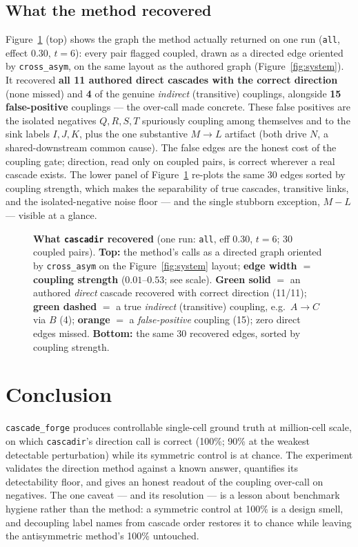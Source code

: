 \documentclass[11pt,a4paper]{article}
\begin{document}
\subsection{What the method recovered}
Figure~\ref{fig:found} (top) shows the graph the method actually returned on one run
(\texttt{all}, effect $0.30$, $t\!=\!6$): every pair flagged coupled, drawn as a directed
edge oriented by \texttt{cross\_asym}, on the same layout as the authored graph
(Figure~\ref{fig:system}). It recovered \textbf{all 11 authored direct cascades with the
correct direction} (none missed) and \textbf{4} of the genuine \emph{indirect} (transitive)
couplings, alongside \textbf{15 false-positive} couplings --- the over-call made concrete.
These false positives are the isolated negatives $Q,R,S,T$ spuriously coupling among
themselves and to the sink labels $I,J,K$, plus the one substantive $M\!\to\!L$ artifact
(both drive $N$, a shared-downstream common cause). The false edges are the honest cost of the
coupling gate; direction, read only on coupled pairs, is correct wherever a real cascade
exists. The lower panel of Figure~\ref{fig:found} re-plots the same 30 edges sorted by coupling
strength, which makes the separability of true cascades, transitive links, and the
isolated-negative noise floor --- and the single stubborn exception, $M\!-\!L$ --- visible at a
glance.

\begin{figure}[h]
\centering


\vspace{4mm}

\caption{\textbf{What \texttt{cascadir} recovered} (one run: \texttt{all}, eff $0.30$,
$t\!=\!6$; 30 coupled pairs). \textbf{Top:} the method's calls as a directed graph oriented by
\texttt{cross\_asym} on the Figure~\ref{fig:system} layout; \textbf{edge width $=$ coupling
strength} ($0.01$--$0.53$; see scale). \textcolor{fgood}{\textbf{Green solid}} $=$ an authored
\emph{direct} cascade recovered with correct direction (11/11); \textcolor{fgood}{\textbf{green
dashed}} $=$ a true \emph{indirect} (transitive) coupling, e.g.\ $A\!\to\!C$ via $B$ (4);
\textcolor{fbad}{\textbf{orange}} $=$ a \emph{false-positive} coupling (15); zero direct edges
missed. \textbf{Bottom:} the same 30 recovered edges, sorted by coupling strength.}
\label{fig:found}
\end{figure}

\clearpage
\section{Conclusion}
\texttt{cascade\_forge} produces controllable single-cell ground truth at million-cell
scale, on which \texttt{cascadir}'s direction call is correct (100\%; 90\% at the weakest
detectable perturbation) while its symmetric control is at chance. The experiment validates
the direction method against a known answer, quantifies its detectability floor, and gives
an honest readout of the coupling over-call on negatives. The one caveat --- and its
resolution --- is a lesson about benchmark hygiene rather than the method: a symmetric
control at 100\% is a design smell, and decoupling label names from cascade order restores
it to chance while leaving the antisymmetric method's 100\% untouched.
\end{document}
